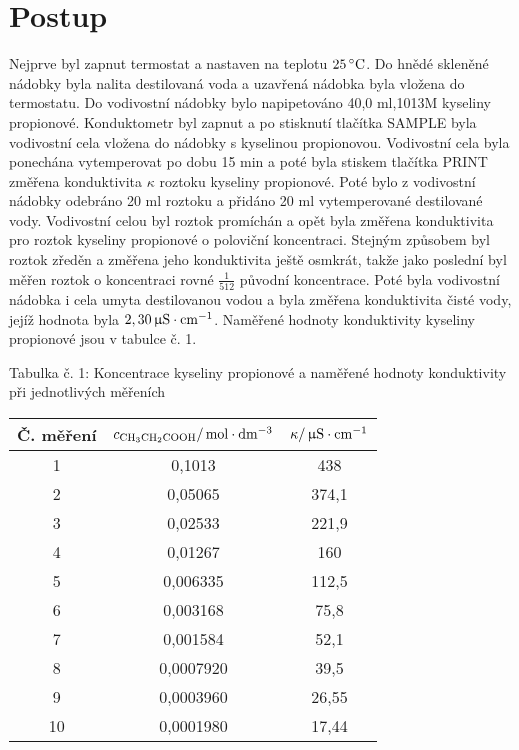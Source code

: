 \documentclass[12pt,a4paper]{article}
\def\ri#1{\mathrm{#1}}
\def\jd#1{\ifmmode\,\mathrm{#1}\else\,\textrm{#1}\fi}
\begin{document}
\section*{Postup}
\noindent Nejprve byl zapnut termostat a nastaven na teplotu $25\jd{^\circ C}$. Do hnědé skleněné nádobky byla nalita destilovaná voda a uzavřená nádobka byla vložena do termostatu. Do vodivostní nádobky bylo napipetováno 40,0\jd{ml} 0,1013M kyseliny propionové. Konduktometr byl zapnut a po stisknutí tlačítka SAMPLE byla vodivostní cela vložena do nádobky s kyselinou propionovou. Vodivostní cela byla ponechána vytemperovat po dobu 15\jd{min} a poté byla stiskem tlačítka PRINT změřena konduktivita $\kappa$ roztoku kyseliny propionové. Poté bylo z vodivostní nádobky odebráno 20\jd{ml} roztoku a přidáno 20\jd{ml} vytemperované destilované vody. Vodivostní celou byl roztok promíchán a opět byla změřena konduktivita pro roztok kyseliny propionové o poloviční koncentraci. Stejným způsobem byl roztok zředěn a změřena jeho konduktivita ještě osmkrát, takže jako poslední byl měřen roztok o koncentraci rovné $\frac{1}{512}$ původní koncentrace. Poté byla vodivostní nádobka i cela umyta destilovanou vodou a byla změřena konduktivita  čisté vody, jejíž hodnota byla $2,30\jd{\upmu S\cdot cm^{-1}}$. Naměřené hodnoty konduktivity kyseliny propionové jsou v tabulce č. 1.
\begin{center}
	\noindent Tabulka č. 1: Koncentrace kyseliny propionové a naměřené hodnoty konduktivity při jednotlivých měřeních\\
	\begin{tabular}{c|c|c}
		Č. měření & $c_\ri{CH_3CH_2COOH}/\jd{mol\cdot dm^{-3}}$ & $\kappa/\jd{\upmu S\cdot cm^{-1}}$\\
		\hline
		1 & 0,1013 & 438\\
		2 & 0,05065 & 374,1\\
		3 & 0,02533 & 221,9\\
		4 & 0,01267 & 160\\
		5 & 0,006335 & 112,5\\
		6 & 0,003168 & 75,8\\
		7 & 0,001584 & 52,1\\
		8 & 0,0007920 & 39,5\\
		9 & 0,0003960 & 26,55\\
		10 & 0,0001980 & 17,44\\
	\end{tabular}
\end{center}
\end{document}
